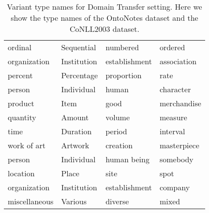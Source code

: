 \documentclass[11pt]{article}
\begin{document}
\begin{table*}[htb]
\begin{center}
{\begin{tabular}{llll}
    ordinal                                          & Sequential                             & numbered                               & ordered                                \\
    organization                                     & Institution                            & establishment                          & association                            \\
    percent                                          & Percentage                             & proportion                             & rate                                   \\
    person                                           & Individual                             & human                                  & character                              \\
    product                                          & Item                                   & good                                   & merchandise                            \\
    quantity                                         & Amount                                 & volume                                 & measure                                \\
    time                                             & Duration                               & period                                 & interval                               \\
    work of art                                      & Artwork                                & creation                               & masterpiece                            \\
    \midrule
    \midrule
    person                                           & Individual                             & human being                            & somebody                               \\
    location                                         & Place                                  & site                                   & spot                                   \\
    organization                                     & Institution                            & establishment                          & company                                \\
    miscellaneous                                    & Various                                & diverse                                & mixed                                  \\
    \bottomrule
    \end{tabular}
    }
\end{center}
\caption{Variant type names for Domain Transfer setting. Here we show the type names of the OntoNotes dataset and the CoNLL2003 dataset.}
\label{app:tab:variant_types_transfer}
\end{table*}
\end{document}
